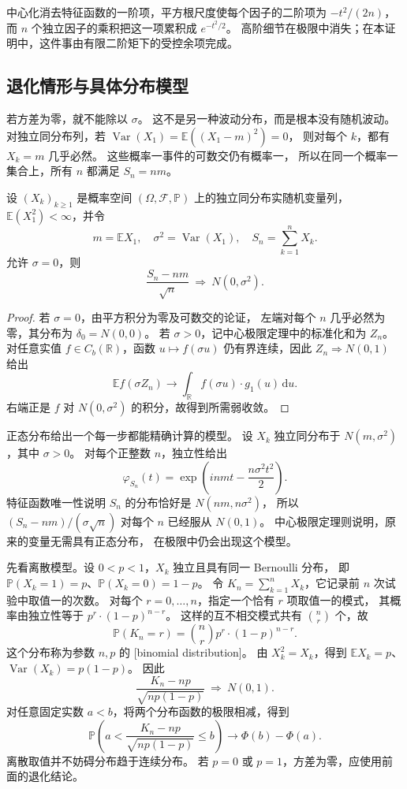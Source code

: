 中心化消去特征函数的一阶项，平方根尺度使每个因子的二阶项为
\(-t^2/(2n)\)，而 \(n\) 个独立因子的乘积把这一项累积成
\(e^{-t^2/2}\)。
高阶细节在极限中消失；在本证明中，这件事由有限二阶矩下的受控余项完成。

\subsection{退化情形与具体分布模型}
\label{b1:subsec:300703}

若方差为零，就不能除以 \(\sigma\)。
这不是另一种波动分布，而是根本没有随机波动。
对独立同分布列，若
\(\operatorname{Var}(X_1)=\mathbb E((X_1-m)^2)=0\)，
则对每个 \(k\)，都有 \(X_k=m\) 几乎必然。
这些概率一事件的可数交仍有概率一，
所以在同一个概率一集合上，所有 \(n\) 都满足 \(S_n=nm\)。

\begin{corollary}\label{b1:cor:30-clt-degenerate}
设 \((X_k)_{k\geq1}\) 是概率空间
\((\Omega,\mathcal F,\mathbb P)\) 上的独立同分布实随机变量列，
\(\mathbb E(X_1^2)<\infty\)，并令
\[
 m=\mathbb EX_1,\quad \sigma^2=\operatorname{Var}(X_1),
 \quad S_n=\sum_{k=1}^nX_k.
\]
允许 \(\sigma=0\)，则
\[
 \frac{S_n-nm}{\sqrt n}\ \Rightarrow\ N(0,\sigma^2).
\]
\end{corollary}
\begin{proof}
若 \(\sigma=0\)，由平方积分为零及可数交的论证，
左端对每个 \(n\) 几乎必然为零，其分布为
\(\delta_0=N(0,0)\)。
若 \(\sigma>0\)，记中心极限定理中的标准化和为 \(Z_n\)。
对任意实值 \(f\in C_b(\mathbb R)\)，函数 \(u\mapsto f(\sigma u)\)
仍有界连续，因此 \(Z_n\Rightarrow N(0,1)\) 给出
\[
 \mathbb E f(\sigma Z_n)
 \longrightarrow\int_{\mathbb R}f(\sigma u)\cdot g_1(u)\,\mathrm du.
\]
右端正是 \(f\) 对 \(N(0,\sigma^2)\) 的积分，故得到所需弱收敛。
\end{proof}

正态分布给出一个每一步都能精确计算的模型。
设 \(X_k\) 独立同分布于 \(N(m,\sigma^2)\)，其中 \(\sigma>0\)。
对每个正整数 \(n\)，独立性给出
\[
 \varphi_{S_n}(t)
 =\exp\left(inmt-\frac{n\sigma^2t^2}{2}\right).
\]
特征函数唯一性说明 \(S_n\) 的分布恰好是 \(N(nm,n\sigma^2)\)，
所以 \((S_n-nm)/(\sigma\sqrt n)\) 对每个 \(n\) 已经服从 \(N(0,1)\)。
中心极限定理则说明，原来的变量无需具有正态分布，
在极限中仍会出现这个模型。

\ProseParagraphBreak

先看离散模型。设 \(0<p<1\)，\(X_k\) 独立且具有同一 Bernoulli 分布，
即 \(\mathbb P(X_k=1)=p\)、\(\mathbb P(X_k=0)=1-p\)。
令 \(K_n=\sum_{k=1}^nX_k\)，它记录前 \(n\) 次试验中取值一的次数。
对每个 \(r=0,\ldots,n\)，指定一个恰有 \(r\) 项取值一的模式，
其概率由独立性等于 \(p^r\cdot(1-p)^{n-r}\)。
这样的互不相交模式共有 \(\binom nr\) 个，故
\[
 \mathbb P(K_n=r)=\binom nr p^r\cdot(1-p)^{n-r}.
\]
这个分布称为参数 \(n,p\) 的
[binomial distribution]。
由 \(X_k^2=X_k\)，得到
\(\mathbb EX_k=p\)、\(\operatorname{Var}(X_k)=p(1-p)\)。
因此
\[
 \frac{K_n-np}{\sqrt{np(1-p)}}\ \Rightarrow\ N(0,1).
\]
对任意固定实数 \(a<b\)，将两个分布函数的极限相减，得到
\[
 \mathbb P\left(
 a<\frac{K_n-np}{\sqrt{np(1-p)}}\leq b
 \right)
 \longrightarrow\Phi(b)-\Phi(a).
\]
离散取值并不妨碍分布趋于连续分布。
若 \(p=0\) 或 \(p=1\)，方差为零，应使用前面的退化结论。

